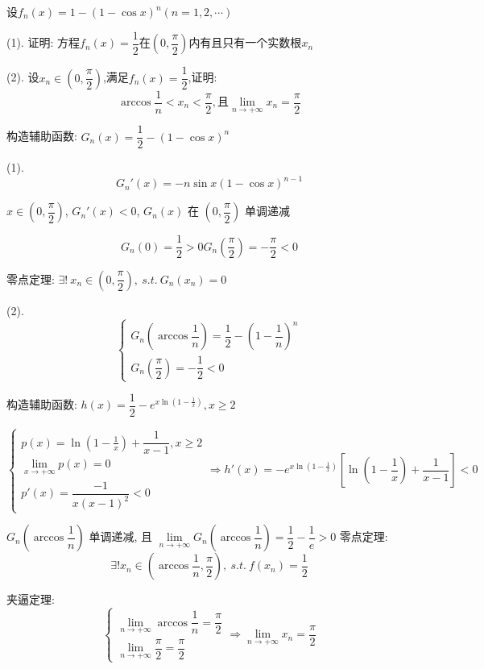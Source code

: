 \begin{proposition}
	设$f_{n}(x)=1-(1-\cos x)^n(n=1,2,\cdots)$

(1). 证明:  方程$f_{n}(x)=\dfrac{1}{2}$在$(0,\dfrac{\pi}{2})$内有且只有一个实数根$x_{n}$

(2). 设$x_{n}\in(0,\dfrac{\pi}{2})$,满足$f_{n}(x)=\dfrac{1}{2}$,证明:  $$\arccos \dfrac{1}{n}<x_{n}<\dfrac{\pi}{2},\text{且}\lim\limits_{n\to +\infty}x_{n}=\dfrac{\pi}{2}$$
\end{proposition}
\begin{solution}
	
	构造辅助函数: $G_{n}(x)=\dfrac{1}{2}-(1-\cos x)^{n}$
	
	(1). $$G_{n}'(x)=-n\sin x(1-\cos x)^{n-1}$$
	
	$x\in(0,\dfrac{\pi}{2})$, $G_{n}'(x)<0$, $G_{n}(x)$ 在 $(0,\dfrac{\pi}{2})$ 单调递减
	
	$$G_{n}(0)=\dfrac{1}{2}>0  G_{n}(\dfrac{\pi}{2})=-\dfrac{\pi}{2}<0$$
	
	零点定理: $\exists!\ x_{n}\in(0,\dfrac{\pi}{2}),\ s.t.\ G_{n}(x_{n})=0$
	
	(2). 
	$$\begin{cases}
		G_{n}(\arccos\dfrac{1}{n}) = \dfrac{1}{2}-(1-\dfrac{1}{n})^{n} \\
		G_{n}(\dfrac{\pi}{2}) = -\dfrac{1}{2} < 0
	\end{cases}$$
	
    构造辅助函数: $h(x) = \dfrac{1}{2} - e^{x\ln(1-\frac{1}{x})},x\geq 2$
	
	$$\begin{cases}
		p(x) = \ln(1-\frac{1}{x}) + \dfrac{1}{x-1}, x\geq 2\\
		\lim\limits_{x\to +\infty} p(x) = 0\\
		p'(x) = \dfrac{-1}{x(x-1)^{2}} < 0  
	\end{cases}\Rightarrow 
	h'(x) = -e^{x\ln(1-\frac{1}{x})}\left[\ln(1-\frac{1}{x})+\dfrac{1}{x-1}\right] < 0$$
	
	$G_{n}(\arccos\dfrac{1}{n})$ 单调递减, 且 $\lim\limits_{n\to+\infty}G_{n}(\arccos\dfrac{1}{n})=\dfrac{1}{2}-\dfrac{1}{e}>0$
	零点定理: 
	$$\exists! x_{n}\in (\arccos \dfrac{1}{n}, \dfrac{\pi}{2}),\ s.t.\ f(x_{n}) = \dfrac{1}{2}$$
	
	夹逼定理:  
	$$\begin{cases}
		\lim\limits_{n\to  +\infty}\arccos \dfrac{1}{n}=\dfrac{\pi}{2}\\
		\lim\limits_{n\to  +\infty}\dfrac{\pi}{2}=\dfrac{\pi}{2}
	\end{cases}
	\Rightarrow \lim\limits_{n\to +\infty}x_{n}=\dfrac{\pi}{2}$$
	
\end{solution}

